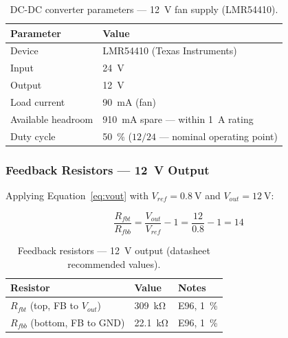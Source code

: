 \begin{table}[H]
  \caption{DC-DC converter parameters — \SI{12}{\volt} fan supply (LMR54410).}
  \label{tab:converter_12v}
  \centering
  \begin{tabularx}{\textwidth}{|X|X|}
    \hline
    \textbf{Parameter} & \textbf{Value} \\ \hline \hline
    Device          & LMR54410 (Texas Instruments) \\ \hline
    Input           & \SI{24}{\volt} \\ \hline
    Output          & \SI{12}{\volt} \\ \hline
    Load current    & \SI{90}{\milli\ampere} (fan) \\ \hline
    Available headroom & \SI{910}{\milli\ampere} spare — within \SI{1}{\ampere} rating \\ \hline
    Duty cycle      & \SI{50}{\percent} ($12/24$ — nominal operating point) \\ \hline
  \end{tabularx}
\end{table}

\subsubsection{Feedback Resistors — \SI{12}{\volt} Output}
\label{sec:12v_feedback}

Applying Equation~\eqref{eq:vout} with $V_{ref} = \SI{0.8}{\volt}$ and $V_{out} = \SI{12}{\volt}$:

\begin{equation}
  \frac{R_{fbt}}{R_{fbb}} = \frac{V_{out}}{V_{ref}} - 1 = \frac{12}{0.8} - 1 = 14
  \label{eq:fb_ratio_12v}
\end{equation}

\begin{table}[H]
  \caption{Feedback resistors — \SI{12}{\volt} output (datasheet recommended values).}
  \label{tab:fb_12v}
  \centering
  \begin{tabularx}{\textwidth}{|X|X|X|}
    \hline
    \textbf{Resistor} & \textbf{Value} & \textbf{Notes} \\ \hline \hline
    $R_{fbt}$ (top, FB to $V_{out}$) & \SI{309}{\kilo\ohm}  & E96, \SI{1}{\percent} \\ \hline
    $R_{fbb}$ (bottom, FB to GND)    & \SI{22.1}{\kilo\ohm} & E96, \SI{1}{\percent} \\ \hline
  \end{tabularx}
\end{table}

